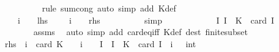 \begin{isabellebody}
\ \ \ \ \ \ \ \ \isamarkupfalse%
\ {\isacharparenleft}{\kern0pt}rule\ sum{\isachardot}{\kern0pt}cong{\isacharparenright}{\kern0pt}\ {\isacharparenleft}{\kern0pt}auto\ simp\ add{\isacharcolon}{\kern0pt}\ K{\isacharunderscore}{\kern0pt}def{\isacharparenright}{\kern0pt}\isanewline
\ \ \ \ \ \ \isamarkupfalse%
\ \isamarkupfalse%
\ {\isachardoublequoteopen}{\isacharparenleft}{\kern0pt}{\isacharminus}{\kern0pt}\ {}{\isacharparenright}{\kern0pt}\ {\isacharcircum}{\kern0pt}\ {\isacharparenleft}{\kern0pt}i\ {\isacharplus}{\kern0pt}\ {}{\isacharparenright}{\kern0pt}\ {\isacharasterisk}{\kern0pt}\ {\isacharquery}{\kern0pt}lhs\ {\isacharequal}{\kern0pt}\ {\isacharparenleft}{\kern0pt}{\isacharminus}{\kern0pt}\ {}{\isacharparenright}{\kern0pt}\ {\isacharcircum}{\kern0pt}\ {\isacharparenleft}{\kern0pt}i\ {\isacharplus}{\kern0pt}\ {}{\isacharparenright}{\kern0pt}\ {\isacharasterisk}{\kern0pt}\ {\isacharquery}{\kern0pt}rhs{\isachardoublequoteclose}\isanewline
\ \ \ \ \ \ \ \ \isamarkupfalse%
\ simp\isanewline
\ \ \ \ \isamarkupfalse%
\isanewline
\ \ \ \ \isamarkupfalse%
\ \isamarkupfalse%
\ {\isachardoublequoteopen}{\isacharbraceleft}{\kern0pt}I{\isachardot}{\kern0pt}\ I\ {\isasymsubseteq}\ K\ {\isasymand}\ card\ I\ {\isacharequal}{\kern0pt}\ {}{\isacharbraceright}{\kern0pt}\ {\isacharequal}{\kern0pt}\ {\isacharbraceleft}{\kern0pt}{\isacharbraceleft}{\kern0pt}{\isacharbraceright}{\kern0pt}{\isacharbraceright}{\kern0pt}{\isachardoublequoteclose}\isanewline
\ \ \ \ \ \ \isamarkupfalse%
\ assms\ \isamarkupfalse%
\ {\isacharparenleft}{\kern0pt}auto\ simp\ add{\isacharcolon}{\kern0pt}\ card{\isacharunderscore}{\kern0pt}eq{\isacharunderscore}{\kern0pt}{}{\isacharunderscore}{\kern0pt}iff\ K{\isacharunderscore}{\kern0pt}def\ dest{\isacharcolon}{\kern0pt}\ finite{\isacharunderscore}{\kern0pt}subset{\isacharparenright}{\kern0pt}\isanewline
\ \ \ \ \isamarkupfalse%
\ \isamarkupfalse%
\ {\isachardoublequoteopen}{\isacharquery}{\kern0pt}rhs\ {\isacharequal}{\kern0pt}\ {\isacharparenleft}{\kern0pt}{\isasymSum}i\ {\isacharequal}{\kern0pt}\ {}{\isachardot}{\kern0pt}{\isachardot}{\kern0pt}card\ K{\isachardot}{\kern0pt}\ {\isacharparenleft}{\kern0pt}{\isacharminus}{\kern0pt}\ {}{\isacharparenright}{\kern0pt}\ {\isacharcircum}{\kern0pt}\ {\isacharparenleft}{\kern0pt}i\ {\isacharplus}{\kern0pt}\ {}{\isacharparenright}{\kern0pt}\ {\isacharasterisk}{\kern0pt}\ {\isacharparenleft}{\kern0pt}{\isasymSum}I\ {\isacharbar}{\kern0pt}\ I\ {\isasymsubseteq}\ K\ {\isasymand}\ card\ I\ {\isacharequal}{\kern0pt}\ i{\isachardot}{\kern0pt}\ {}\ {\isacharcolon}{\kern0pt}{\isacharcolon}{\kern0pt}\ int{\isacharparenright}{\kern0pt}{\isacharparenright}{\kern0pt}\ {\isacharplus}{\kern0pt}\ {}{\isachardoublequoteclose}\isanewline

\end{isabellebody}
